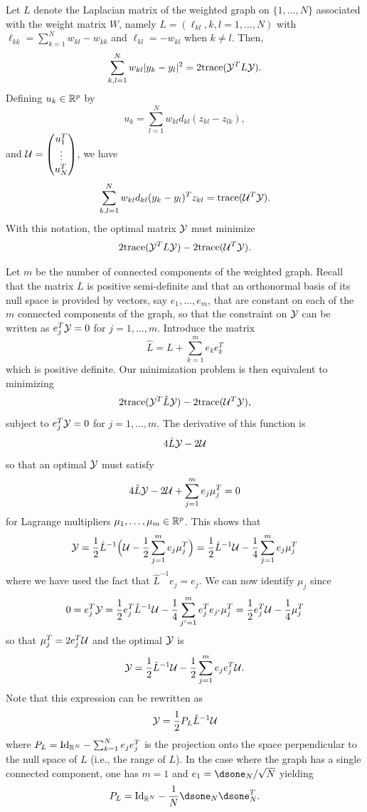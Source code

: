 Let $L$ denote the Laplacian matrix of the weighted graph on $\{1, \ldots, N\}$ associated with the weight matrix $W$, namely $L = (\ell_{kl}, k,l=1, \ldots, N)$ with $\ell_{kk} = \sum_{k=1}^N w_{kl} - w_{kk}$ and $\ell_{kl} = -w_{kl}$ when $k\neq l$. Then, 
\[
\sum_{k,l=1}^N w_{kl} |y_k-y_l|^2 = 2 {\mathrm{trace}}( {\mathcal Y}^T L {\mathcal Y}).
\]
Defining $u_k\in {\mathbb{R}}^p$ by
\[
u_k = \sum_{l=1}^N w_{kl} d_{kl} (z_{kl}-z_{lk}),
\]
and ${\mathcal U} = \begin{pmatrix} u_1^T\\ \vdots \\ u_N^T\end{pmatrix}$, we have
\[
\sum_{k,l=1}^N w_{kl} d_{kl} (y_k-y_l)^T z_{kl} = {\mathrm{trace}} ({\mathcal U}^T {\mathcal Y}).
\]
With this notation, the optimal matrix ${\mathcal Y}$ must minimize
\[
2 {\mathrm{trace}}( {\mathcal Y}^T L {\mathcal Y}) - 2 {\mathrm{trace}}({\mathcal U}^T {\mathcal Y}). 
\]

Let $m$ be the number of connected components of the weighted graph.
Recall that the matrix $L$ is positive semi-definite and that an orthonormal basis of its null space is provided by vectors, say $e_1, \ldots, e_m$, that are constant on each of the $m$ connected components of the graph, so that the constraint on ${\mathcal Y}$ can be written as $e_j^T{\mathcal Y} = 0$ for $j=1, \ldots, m$. Introduce the matrix
\[
\hat L = L + \sum_{k=1}^m e_ke_k^T
\]
which is positive definite. Our minimization problem is then equivalent to minimizing
\[
2 {\mathrm{trace}}( {\mathcal Y}^T \hat L {\mathcal Y}) - 2 {\mathrm{trace}}({\mathcal U}^T {\mathcal Y}), 
\]
subject to $e_j^T{\mathcal Y} = 0$ for $j=1, \ldots, m$. The derivative of this function is 
\[
 4 \hat L{\mathcal Y} - 2 {\mathcal U}
\]
so that an optimal ${\mathcal Y}$ must satisfy
\[
4 \hat L{\mathcal Y} - 2 {\mathcal U} + \sum_{j=1}^m  e_j\mu_j^T = 0
\]
for Lagrange multipliers $\mu_1, \ldots, \mu_m\in {\mathbb{R}}^p$. This shows that
\[
{\mathcal Y} = \frac12 \hat L^{-1} \Big({\mathcal U} - \frac12 \sum_{j=1}^m  e_j\mu_j^T\Big) =  \frac12 \hat L^{-1} {\mathcal U} - \frac14 \sum_{j=1}^m  e_j\mu_j^T
\]
where we have used the fact that $\hat L^{-1} e_j = e_j$. We can now identify $\mu_j$ since
\[
0 = e_j^T{\mathcal Y} = \frac12 e_j^T \hat L^{-1} {\mathcal U} - \frac14 \sum_{j'=1}^m e_j^T e_{j'} \mu_j^T = \frac12 e_j^T {\mathcal U} - \frac14 \mu_j^T
\]
so that $\mu_j^T = 2 e_j^T{\mathcal U}$ and the optimal ${\mathcal Y}$ is
\[
{\mathcal Y} = \frac12 \hat L^{-1} {\mathcal U} - \frac12 \sum_{j=1}^m e_j e_j^T {\mathcal U}.
\]
Note that this expression can be rewritten as
\[
{\mathcal Y} = \frac12  P_L \hat L^{-1} {\mathcal U}
\]
where $P_L = \Id[N]  - \sum_{k=1}^N e_je_j^T$ is the projection onto the space perpendicular to the null space of $L$ (i.e., the range of $L$).
In the case where the graph has a single connected component, one has  $m=1$ and $e_1 = \dsone_N/\sqrt N$ yielding
\[
P_L = \Id[N] - \frac1N \dsone_N\dsone_N^T.
\]

